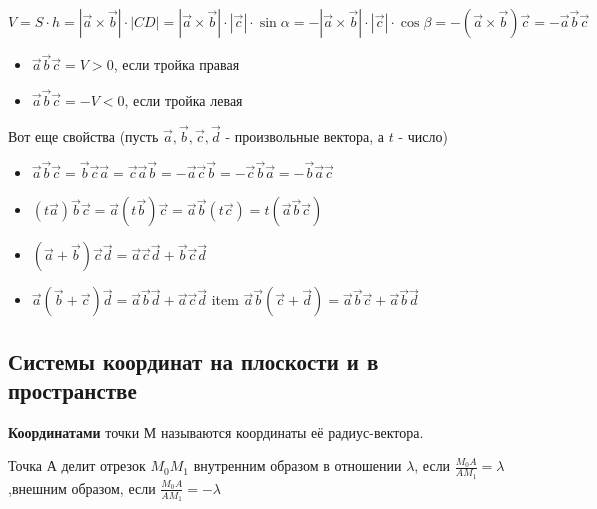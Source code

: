 \documentclass[a4paper]{article}
\begin{document}
\begin{hproof}
\begin{equation}
V = S \cdot h = | \vec{a} \times \vec{b} | \cdot | CD | = | \vec{a} \times \vec{b} | \cdot | \vec{c} | \cdot \sin \alpha = - | \vec{a} \times \vec{b} | \cdot | \vec{c} | \cdot \cos \beta = - (\vec{a} \times \vec{b}) \vec{c} = -\vec{a} \vec{b} \vec{c}
\end{equation}

\begin{itemize}
\item $\vec{a} \vec{b} \vec{c} = V > 0$, если тройка правая
\item $\vec{a} \vec{b} \vec{c} = -V < 0$, если тройка левая
\end{itemize}

\end{hproof}


Вот еще свойства (пусть $\vec{a}, \vec{b}, \vec{c}, \vec{d}$ - произвольные вектора, а $t$ - число)
\begin{itemize}
\item $\vec{a} \vec{b} \vec{c} = \vec{b} \vec{c} \vec{a} = \vec{c} \vec{a} \vec{b} = -\vec{a} \vec{c} \vec{b} = -\vec{c} \vec{b} \vec{a} = -\vec{b} \vec{a} \vec{c}$
\item $(t\vec{a}) \vec{b} \vec{c} = \vec{a} (t \vec{b}) \vec{c} = \vec{a} \vec{b} (t \vec{c}) = t (\vec{a} \vec{b} \vec{c})$
\item $(\vec{a} + \vec{b}) \vec{c} \vec{d} = \vec{a} \vec{c} \vec{d} + \vec{b} \vec{c} \vec{d} $
\item $\vec{a} (\vec{b} + \vec{c}) \vec{d} = \vec{a} \vec{b} \vec{d} + \vec{a} \vec{c} \vec{d}$
item $\vec{a} \vec{b} (\vec{c} + \vec{d}) = \vec{a} \vec{b} \vec{c} + \vec{a} \vec{b} \vec{d}$
\end{itemize}

\newpage \begin{center}\begin{Large}\end{Large}\end{center}

\subsection*{Системы координат на плоскости и в пространстве}
\textbf{Координатами} точки М называются координаты её радиус-вектора.

Точка А делит отрезок $M_0 M_1$ внутренним образом в отношении $\lambda$, если $\displaystyle \frac{M_0 A}{A M_1} = \lambda$,\newline внешним образом, если $\displaystyle \frac{M_0 A}{A M_1} = -\lambda$
\end{document}
